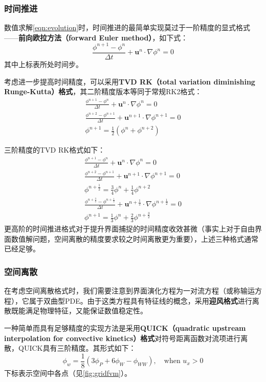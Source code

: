\documentclass[11pt]{article}
\begin{document}
\subsubsection{时间推进}
数值求解\autoref{eqn:evolution}时，时间推进的最简单实现莫过于一阶精度的显式格式——\textbf{前向欧拉方法（forward Euler method）}，如下式：
\begin{equation}
    \frac{\phi^{n+1}-\phi^n}{\Delta t}+\bm{u}^n\cdot\nabla\phi^n=0
\end{equation}
其中上标表所处时间步。

考虑进一步提高时间精度，可以采用\textbf{TVD RK（total variation diminishing Runge-Kutta）格式}，其二阶精度版本等同于常规RK2格式：
\begin{eqnarray}
    \frac{\phi^{n+1}-\phi^n}{\Delta t}+\bm{u}^n\cdot\nabla\phi^n=0 \\
    \frac{\phi^{n+2}-\phi^{n+1}}{\Delta t}+\bm{u}^{n+1}\cdot\nabla\phi^{n+1}=0 \\
    \phi^{n+1}=\frac{1}{2}\left(\phi^n+\phi^{n+2}\right)
\end{eqnarray}

三阶精度的TVD RK格式如下：
\begin{eqnarray}
    \frac{\phi^{n+1}-\phi^n}{\Delta t}+\bm{u}^n\cdot\nabla\phi^n=0 \\
    \frac{\phi^{n+2}-\phi^{n+1}}{\Delta t}+\bm{u}^{n+1}\cdot\nabla\phi^{n+1}=0 \\
    \phi^{n+\frac{1}{2}}=\frac{3}{4}\phi^n+\frac{1}{4}\phi^{n+2} \\
    \frac{\phi^{n+\frac{3}{2}}-\phi^{n+\frac{1}{2}}}{\Delta t}+\bm{u}^{n+\frac{1}{2}}\cdot\nabla\phi^{n+\frac{1}{2}}=0 \\
    \phi^{n+1}=\frac{1}{3}\phi^{n}+\frac{2}{3}\phi^{n+\frac{3}{2}}
\end{eqnarray}
更高阶的时间推进格式对于提升界面捕捉的时间精度收效甚微（事实上对于自由界面数值解问题，空间离散的精度要求较之时间离散更为重要\citep{osher_level_2003}），上述三种格式通常已经足够。

\subsubsection{空间离散}
在考虑空间离散格式时，我们需要注意到界面演化方程为一对流方程（或称输运方程），它属于双曲型PDE。由于这类方程具有特征线的概念，采用\textbf{迎风格式}进行离散既能满足物理特征，又能保证数值稳定性。

一种简单而具有足够精度的实现方法是采用\textbf{QUICK（quadratic upstream interpolation for convective kinetics）格式}对符号距离函数对流项进行离散，QUICK具有三阶精度。其形式如下：
\begin{equation}
    \phi_w=\frac{1}{8}\left(3\phi_P+6\phi_{W}-\phi_{WW}\right),\quad \text{when }u_x>0
\end{equation}
下标表示空间中各点（见\autoref{fig:gridfvm}）。
\end{document}
